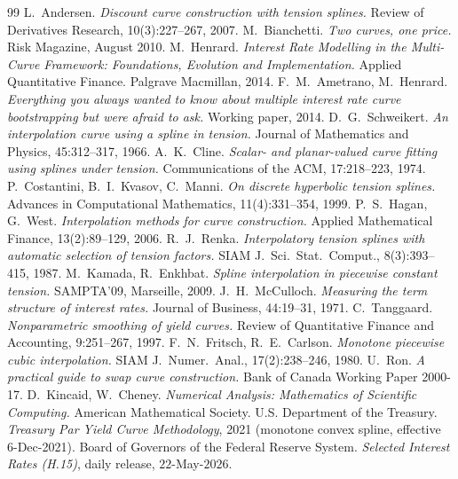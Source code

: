 \documentclass[10pt]{article}
\begin{document}
\begin{thebibliography}{99}
\small
{} L.~Andersen. \emph{Discount curve construction with tension splines.}
Review of Derivatives Research, 10(3):227--267, 2007.
 M.~Bianchetti. \emph{Two curves, one price.} Risk Magazine, August 2010.
 M.~Henrard. \emph{Interest Rate Modelling in the Multi-Curve Framework:
Foundations, Evolution and Implementation.} Applied Quantitative Finance. Palgrave Macmillan, 2014.
 F.~M.~Ametrano, M.~Henrard. \emph{Everything you always wanted to know about
multiple interest rate curve bootstrapping but were afraid to ask.} Working paper, 2014.
 D.~G.~Schweikert. \emph{An interpolation curve using a spline in tension.}
Journal of Mathematics and Physics, 45:312--317, 1966.
 A.~K.~Cline. \emph{Scalar- and planar-valued curve fitting using splines under
tension.} Communications of the ACM, 17:218--223, 1974.
 P.~Costantini, B.~I.~Kvasov, C.~Manni. \emph{On discrete hyperbolic tension
splines.} Advances in Computational Mathematics, 11(4):331--354, 1999.
 P.~S.~Hagan, G.~West. \emph{Interpolation methods for curve construction.}
Applied Mathematical Finance, 13(2):89--129, 2006.
 R.~J.~Renka. \emph{Interpolatory tension splines with automatic selection of
tension factors.} SIAM J.\ Sci.\ Stat.\ Comput., 8(3):393--415, 1987.
 M.~Kamada, R.~Enkhbat. \emph{Spline interpolation in piecewise constant
tension.} SAMPTA'09, Marseille, 2009.
 J.~H.~McCulloch. \emph{Measuring the term structure of interest rates.}
Journal of Business, 44:19--31, 1971.
 C.~Tanggaard. \emph{Nonparametric smoothing of yield curves.}
Review of Quantitative Finance and Accounting, 9:251--267, 1997.
 F.~N.~Fritsch, R.~E.~Carlson. \emph{Monotone piecewise cubic interpolation.}
SIAM J.\ Numer.\ Anal., 17(2):238--246, 1980.
 U.~Ron. \emph{A practical guide to swap curve construction.} Bank of Canada
Working Paper 2000-17.
 D.~Kincaid, W.~Cheney. \emph{Numerical Analysis: Mathematics of Scientific
Computing.} American Mathematical Society.
 U.S. Department of the Treasury. \emph{Treasury Par Yield Curve
Methodology}, 2021 (monotone convex spline, effective 6-Dec-2021).
 Board of Governors of the Federal Reserve System. \emph{Selected Interest Rates
(H.15)}, daily release, $22$-May-$2026$.
\end{thebibliography}
\end{document}
